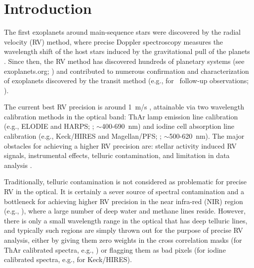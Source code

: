 \section{Introduction}\label{sec:intro}

The first exoplanets around main-sequence stars were discovered by the
radial velocity (RV) method, where precise Doppler spectroscopy
measures the wavelength shift of the host stars induced by the
gravitational pull of the planets \citep{1988ApJ...331..902C,
  1989Natur.339...38L, 1993ApJ...413..339H, 1995Natur.378..355M,
  1996ApJ...464L.153B}. Since then, the RV method has discovered
hundreds of planetary systems (see exoplanets.org; \citealt{eod2014})
and contributed to numerous confirmation and characterization of
exoplanets discovered by the transit method (e.g., for
\kepler\ follow-up observations; \citealt{Marcy2014}).

The current best RV precision is around 1~m/s \citep{eprv2015},
attainable via two wavelength calibration methods in the optical band:
ThAr lamp emission line calibration (e.g., ELODIE and HARPS;
\citealt{elodie, harps-s}; $\sim$400-690~nm) and iodine cell
absorption line calibration (e.g., Keck/HIRES and Magellan/PFS;
\citealt{butler1996, 2010SPIE.7735E..53C}; $\sim$500-620~nm). The
major obstacles for achieving a higher RV precision are: stellar
activity induced RV signals, instrumental effects, telluric
contamination, and limitation in data analysis \citep{eprv2015}.

Traditionally, telluric contamination is not considered as problematic
for precise RV in the optical. It is certainly a sever source of
spectral contamination and a bottleneck for achieving higher RV
precision in the near infra-red (NIR) region (e.g.,
\citealt{2010ApJ...713..410B}), where a large number of deep water and
methane lines reside. However, there is only a small wavelength
range in the optical that has deep telluric lines, and typically such
regions are simply thrown out for the purpose of precise RV analysis,
either by giving them zero weights in the cross correlation masks (for
ThAr calibrated spectra, e.g., \citealt{2002A&A...388..632P}) or
flagging them as bad pixels (for iodine calibrated spectra, e.g., for
Keck/HIRES).

